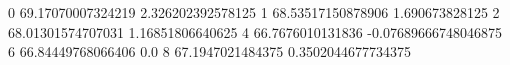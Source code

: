 0 69.17070007324219 2.326202392578125
1 68.53517150878906 1.690673828125
2 68.01301574707031 1.16851806640625
4 66.7676010131836 -0.07689666748046875
6 66.84449768066406 0.0
8 67.1947021484375 0.3502044677734375
